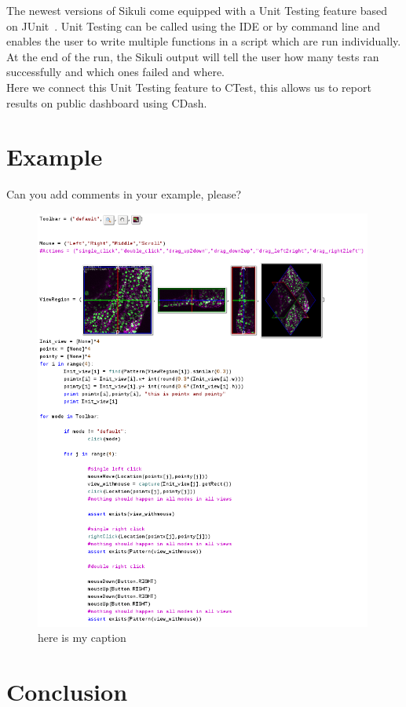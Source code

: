 \documentclass{InsightArticle}
\begin{document}
The newest versions of Sikuli come equipped with a Unit Testing feature based
on JUnit~\cite{}. Unit Testing can be called using the IDE or by command
line and enables the user to write multiple functions in a script which are
run individually. At the end of the run, the Sikuli output will tell the user
how many tests ran successfully and which ones failed and where.\\

Here we connect this Unit Testing feature to CTest, this allows us to report
results on public dashboard using CDash.


\section{Example}

Can you add comments in your example, please?

\begin{figure}[htp]
 \centering
 \includegraphics[width=0.99\textwidth]{Images/Gofigure2Example.png}
 \caption{here is my caption}
 \label{fig:Gofigure2Example}
\end{figure}
\section{Conclusion}

\clearpage



\end{document}
